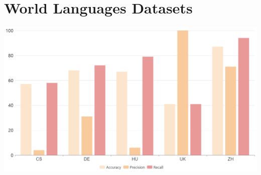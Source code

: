 \documentclass[12pt,journal,compsoc]{IEEEtran}
\begin{document}
\newpage %

\section{World Languages Datasets}
\begin{center}
  \includegraphics[scale=0.24]{world-languages-datasets.png}
\end{center}


\newpage %
\end{document}
